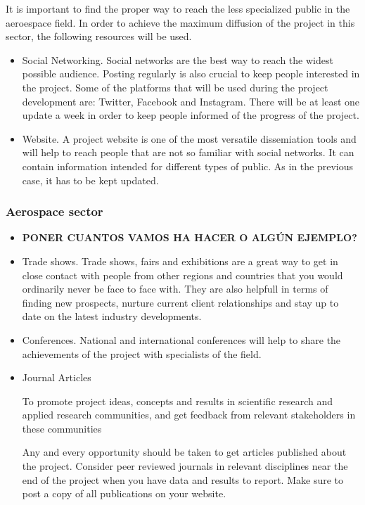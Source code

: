 It is important to find the proper way to reach the less specialized public in the aeroespace field. In order to achieve the maximum diffusion of the project in this sector,  the following resources will be used.

\begin{itemize}
\item{ 
	Social Networking. Social networks are the best way to reach the widest possible audience. Posting regularly is also crucial to keep people interested in the project. Some of the platforms that will be used during the project development are: Twitter, Facebook and Instagram. There will be at least one update a week in order to keep people informed of the progress of the project.
}
\item {
	Website. A project website is one of the most versatile dissemiation tools and will help to reach people that are not so familiar with social networks. It can contain information intended for different types of public. As in the previous case, it has to be kept updated.
}
\end{itemize}

\subsubsection{Aerospace sector}

\begin{itemize}
\item\textbf{PONER CUANTOS VAMOS HA HACER O ALGÚN EJEMPLO?}
\item{
	Trade shows. Trade shows, fairs and exhibitions are a great way to get in close contact with people from other regions and countries that you would ordinarily never be face to face with. They are also helpfull in terms of finding new prospects, nurture current client relationships and stay up to date on the latest industry developments. 
}
\item {
	Conferences. National and international conferences will help to share the achievements of the project with specialists of the field.
}
\item {
	Journal Articles
	
	
	To promote project ideas, concepts and results in scientific research and applied research communities, and get feedback from relevant stakeholders in these communities
	
	Any and every opportunity should be taken to get articles published about the project. Consider peer reviewed journals in relevant disciplines near the end of the project when you have data and results to report. Make sure to post a copy of all publications on your website. 
}
\end{itemize}